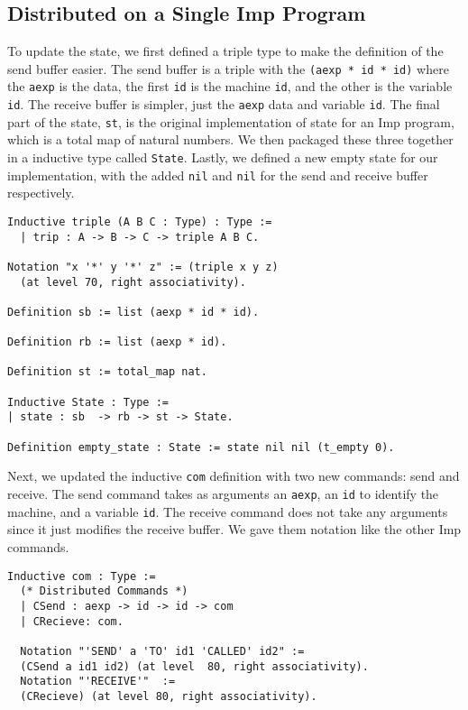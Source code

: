 \documentclass{llncs}
\begin{document}
\subsection{Distributed on a Single Imp Program}
To update the state, we first defined a triple type to make the definition of the send buffer easier. The send buffer is a triple with the \lstinline|(aexp * id * id)| where the \lstinline|aexp| is the data, the first \lstinline|id| is the machine \lstinline|id|, and the other is the variable \lstinline|id|. The receive buffer is simpler, just the \lstinline|aexp| data and variable \lstinline|id|. The final part of the state, \lstinline|st|, is the original implementation of state for an Imp program, which is a total map of natural numbers. We then packaged these three together in a inductive type called \lstinline|State|. Lastly, we defined a new empty state for our implementation, with the added \lstinline|nil| and \lstinline|nil| for the send and receive buffer respectively. 

\begin{lstlisting}
Inductive triple (A B C : Type) : Type :=
  | trip : A -> B -> C -> triple A B C.

Notation "x '*' y '*' z" := (triple x y z) 
  (at level 70, right associativity).

Definition sb := list (aexp * id * id).

Definition rb := list (aexp * id).

Definition st := total_map nat.

Inductive State : Type :=
| state : sb  -> rb -> st -> State.

Definition empty_state : State := state nil nil (t_empty 0).
\end{lstlisting}

Next, we updated the inductive \lstinline|com| definition with two new commands: send and receive. The send command takes as arguments an \lstinline|aexp|, an \lstinline|id| to identify the machine, and a variable \lstinline|id|. The receive command does not take any arguments since it just modifies the receive buffer. We gave them notation like the other Imp commands.

\begin{lstlisting}
Inductive com : Type :=
  (* Distributed Commands *)
  | CSend : aexp -> id -> id -> com
  | CRecieve: com.
  
  Notation "'SEND' a 'TO' id1 'CALLED' id2" :=
  (CSend a id1 id2) (at level  80, right associativity).
  Notation "'RECEIVE'"  :=
  (CRecieve) (at level 80, right associativity).
\end{lstlisting}
\end{document}
